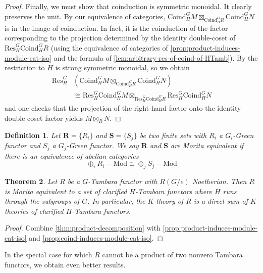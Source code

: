 \documentclass[11pt,dvipsnames]{amsart}
\newtheorem{theorem}{Theorem}[section]
\theoremstyle{BoldRemark}
\newtheorem{definition}[theorem]{Definition}
\newcommand{\Mod}{\mathrm{Mod}}
\begin{document}
\begin{proof}
	Finally, we must show that coinduction is symmetric monoidal. It clearly preserves the unit. By our equivalence of categories, $\mathrm{Coind}_H^G M \boxtimes_{\mathrm{Coind}_H^G R} \mathrm{Coind}_H^G N$ is in the image of coinduction. In fact, it is the coinduction of the factor corresponding to the projection determined by the identity double-coset of $\mathrm{Res}_H^G \mathrm{Coind}_H^G R$ (using the equivalence of categories of \cref{prop:product-induces-module-cat-iso} and the formula of \cref{lem:arbitrary-res-of-coind-of-HTamb}). By \cite[Lemma 6.6]{Cha24} the restriction to $H$ is strong symmetric monoidal, so we obtain
\begin{align*}
	\mathrm{Res}_H^G & \left( \mathrm{Coind}_H^G M \boxtimes_{\mathrm{Coind}_H^G R} \mathrm{Coind}_H^G N \right) \\
	& \cong \mathrm{Res}_H^G \mathrm{Coind}_H^G M \boxtimes_{\mathrm{Res}_H^G \mathrm{Coind}_H^G R} \mathrm{Res}_H^G \mathrm{Coind}_H^G N 
\end{align*}
and one checks that the projection of the right-hand factor onto the identity double coset factor yields $M \boxtimes_R N$.
\end{proof}

\begin{definition}
	Let $\mathbf{R} = \{ R_i \}$ and $\mathbf{S} = \{ S_j \}$ be two finite sets with $R_i$ a $G_i$-Green functor and $S_j$ a $G_j$-Green functor. We say $\mathbf{R}$ and $\mathbf{S}$ are Morita equivalent if there is an equivalence of abelian categories \[ \oplus_i R_i {-} \Mod \cong \oplus_j S_j {-} \Mod \]
\end{definition}

\begin{theorem}\label{thm:Morita-equiv}
	Let $R$ be a $G$-Tambara functor with $R(G/e)$ Noetherian. Then $R$ is Morita equivalent to a set of clarified $H$-Tambara functors where $H$ runs through the subgroups of $G$. In particular, the $K$-theory of $R$ is a direct sum of $K$-theories of clarified $H$-Tambara functors.
\end{theorem}

\begin{proof}
	Combine \cref{thm:product-decomposition} with \cref{prop:product-induces-module-cat-iso} and \cref{prop:coind-induces-module-cat-iso}.
\end{proof}

In the special case for which $R$ cannot be a product of two nonzero Tambara functors, we obtain even better results.
\end{document}
